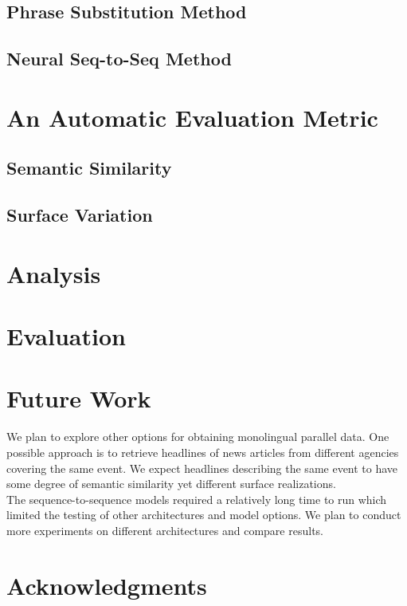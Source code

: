 \documentclass[11pt,letterpaper]{article}
\begin{document}
\subsection{Phrase Substitution Method}
\subsection{Neural Seq-to-Seq Method}

\section{An Automatic Evaluation Metric}
\subsection{Semantic Similarity}	
\subsection{Surface Variation}

\section{Analysis}

\section{Evaluation}

\section{Future Work}
 We plan to explore other options for obtaining monolingual parallel data. One possible approach is to retrieve headlines of news articles from different agencies covering the same event. We expect headlines describing the same event to have some degree of semantic similarity yet different surface realizations.\\
 The sequence-to-sequence models required a relatively long time to run which limited the testing of other architectures and model options. We plan to conduct more experiments on different architectures and compare results.  





\section*{Acknowledgments}



\end{document}

